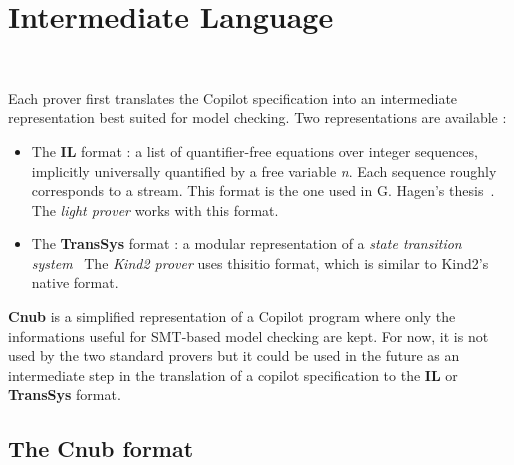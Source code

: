 \section{Intermediate Language}~\label{sec:il}

Each prover first translates the Copilot specification into an
intermediate representation best suited for model checking. Two
representations are available :

\begin{itemize}
\item
  The \textbf{IL} format : a list
  of quantifier-free equations over integer sequences, implicitly
  universally quantified by a free variable \emph{n}. Each sequence
  roughly corresponds to a stream. This format is the one used in G.
  Hagen's thesis~\cite{HagenPhD}. The \emph{light prover} works with this
  format.
\item
  The \textbf{TransSys} format : a modular representation of a \emph{state transition system}~\cite{XX} The \emph{Kind2 prover} uses thisitio
  format, which is similar to Kind2's native format.
\end{itemize}

\textbf{Cnub} is a simplified representation of a Copilot program where
only the informations useful for SMT-based model checking are kept. For
now, it is not used by the two standard provers but it could be used in
the future as an intermediate step in the translation of a copilot specification to the \textbf{IL} or \textbf{TransSys} format.







\subsection{The \textbf{Cnub} format}

